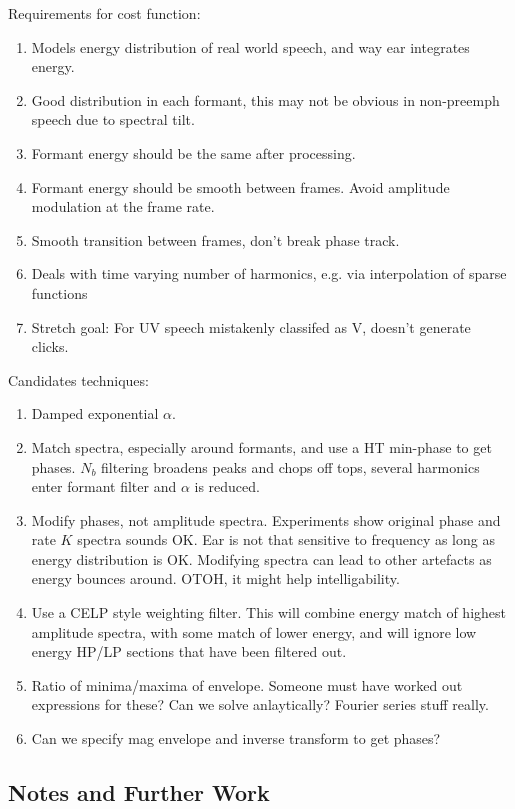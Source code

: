 \documentclass{article}
\begin{document}
Requirements for cost function:
\begin{enumerate}
\item Models energy distribution of real world speech, and way ear integrates energy.
\item Good distribution in each formant, this may not be obvious in non-preemph speech due to spectral tilt.
\item Formant energy should be the same after processing.
\item Formant energy should be smooth between frames.  Avoid amplitude modulation at the frame rate.
\item Smooth transition between frames, don't break phase track.
\item Deals with time varying number of harmonics, e.g. via interpolation of sparse functions
\item Stretch goal: For UV speech mistakenly classifed as V, doesn't generate clicks.
\end{enumerate}

Candidates techniques:
\begin{enumerate}
\item Damped exponential $\alpha$.
\item Match spectra, especially around formants, and use a HT min-phase to get phases.  $N_b$ filtering broadens peaks and chops off tops, several harmonics enter formant filter and $\alpha$ is reduced.
\item Modify phases, not amplitude spectra.  Experiments show original phase and rate $K$ spectra sounds OK.  Ear is not that sensitive to frequency as long as energy distribution is OK.  Modifying spectra can lead to other artefacts as energy bounces around. OTOH, it might help intelligability.
\item Use a CELP style weighting filter.  This will combine energy match of highest amplitude spectra, with some match of lower energy, and will ignore low energy HP/LP sections that have been filtered out.
\item Ratio of minima/maxima of envelope.  Someone must have worked out expressions for these?  Can we solve anlaytically?  Fourier series stuff really.
\item Can we specify mag envelope and inverse transform to get phases?
\end{enumerate}

\subsection{Notes and Further Work}
\end{document}
